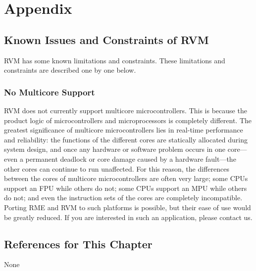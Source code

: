 \chapter{Appendix}\label{ch:9-appendix}

\section{Known Issues and Constraints of RVM}\label{sec:9-1}

RVM has some known limitations and constraints. These limitations and constraints are described one by one below.

\subsection{No Multicore Support}\label{subsec:9-1-1}

RVM does not currently support multicore microcontrollers. This is because the product logic of microcontrollers and microprocessors is completely different. The greatest significance of multicore microcontrollers lies in real-time performance and reliability: the functions of the different cores are statically allocated during system design, and once any hardware or software problem occurs in one core---even a permanent deadlock or core damage caused by a hardware fault---the other cores can continue to run unaffected. For this reason, the differences between the cores of multicore microcontrollers are often very large; some CPUs support an FPU while others do not; some CPUs support an MPU while others do not; and even the instruction sets of the cores are completely incompatible. Porting RME and RVM to such platforms is possible, but their ease of use would be greatly reduced. If you are interested in such an application, please contact us.

\section{References for This Chapter}\label{sec:9-2}

None
